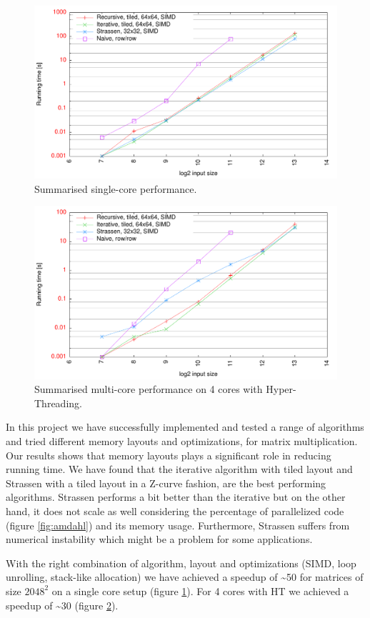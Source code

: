 \begin{figure}[h!]
  \centering
  \includegraphics[width=\textwidth]{"../project2/gnuplots/best_single"}
  \caption{Summarised single-core performance.}
  \label{fig:best_single}
\end{figure}

\begin{figure}[h!]
  \centering
  \includegraphics[width=\textwidth]{"../project2/gnuplots/best_parallel"}
  \caption{Summarised multi-core performance on 4 cores with Hyper-Threading.}
  \label{fig:best_parallel}
\end{figure}

In this project we have successfully implemented and tested a range of algorithms and tried different memory layouts and optimizations, for matrix multiplication. Our results shows that memory layouts plays a significant role in reducing running time. We have found that the iterative algorithm with tiled layout and Strassen with a tiled layout in a Z-curve fashion, are the best performing algorithms. Strassen performs a bit better than the iterative but on the other hand, it does not scale as well considering the percentage of parallelized code (figure \ref{fig:amdahl}) and its memory usage. Furthermore, Strassen suffers from numerical instability which might be a problem for some applications.

With the right combination of algorithm, layout and optimizations (SIMD, loop unrolling, stack-like allocation) we have achieved a speedup of \textasciitilde 50 for matrices of size $2048^2$ on a single core setup (figure \ref{fig:best_single}). For 4 cores with HT we achieved a speedup of \textasciitilde 30 (figure \ref{fig:best_parallel}).